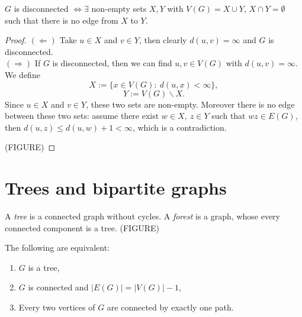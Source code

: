 \begin{lemma} $G$ is disconnected $\Longleftrightarrow \exists$ non-empty sets $X,Y$ with $V(G)=X \cup Y$, $X \cap Y=\emptyset$ such that there is no edge from $X$ to $Y$.
\end{lemma}

\begin{proof}
\emph{$(\Leftarrow)$} Take $u\in X$ and $v \in Y$, then clearly $d(u,v)=\infty$ and $G$ is disconnected.
\\ \emph{$(\Rightarrow)$} If $G$ is disconnected, then we can find $u,v\in V(G)$ with $d(u,v)=\infty$. We define
$$X:=\{x\in V(G): \ d(u,x)<\infty \},$$
$$Y:=V(G) \backslash X.$$
Since $u\in X$ and $v\in Y$, these two sets are non-empty. Moreover there is no edge between these two sets: assume there exist $w\in X,\ z\in Y$ such that $wz \in E(G)$, then $d(u,z)\leqslant d(u,w)+1 <\infty$, which is a contradiction.

(FIGURE)
\end{proof}

\section{Trees and bipartite graphs}

\begin{definition} A \emph{tree} is a connected graph without cycles. A \emph{forest} is a graph, whose every connected component is a tree.
(FIGURE)
\end{definition}

\begin{theorem} The following are equivalent:
\begin{enumerate}
\item $G$ is a tree,
\item $G$ is connected and $|E(G)|=|V(G)|-1$,
\item Every two vertices of $G$ are connected by exactly one path.
\end{enumerate}
\end{theorem}

